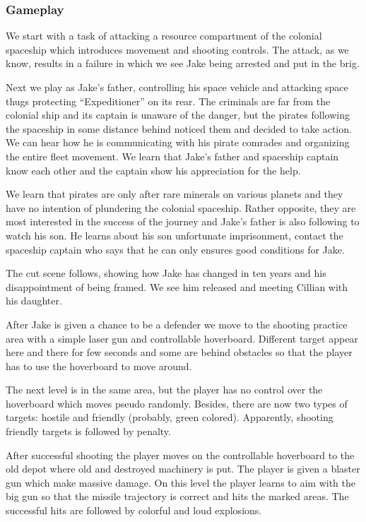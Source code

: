 \documentclass{article}
\begin{document}
\subsubsection*{Gameplay}

We start with a task of attacking a resource compartment of the colonial
spaceship which introduces movement and shooting controls. The attack, as we
know, results in a failure in which we see Jake being arrested and put in the
brig.

Next we play as Jake's father, controlling his space vehicle and attacking space
thugs protecting ``Expeditioner'' on its rear. The criminals are far from the
colonial ship and its captain is unaware of the danger, but the pirates
following the spaceship in some distance behind noticed them and decided to take
action.  We can hear how he is communicating with his pirate comrades and
organizing the entire fleet movement. We learn that Jake's father and spaceship
captain know each other and the captain show his appreciation for the help.

We learn that pirates are only after rare minerals on various planets and they
have no intention of plundering the colonial spaceship. Rather opposite, they
are most interested in the success of the journey and Jake's father is also
following to watch his son. He learns about his son unfortunate imprisonment,
contact the spaceship captain who says that he can only ensures good conditions
for Jake.

The cut scene follows, showing how Jake has changed in ten years and his
disappointment of being framed. We see him released and meeting Cillian with his
daughter.

After Jake is given a chance to be a defender we move to the shooting practice
area with a simple laser gun and controllable hoverboard. Different target
appear here and there for few seconds and some are behind obstacles so that the
player has to use the hoverboard to move around.

The next level is in the same area, but the player has no control over the
hoverboard which moves pseudo randomly. Besides, there are now two types of
targets: hostile and friendly (probably, green colored). Apparently, shooting
friendly targets is followed by penalty.

After successful shooting the player moves on the controllable hoverboard to the
old depot where old and destroyed machinery is put. The player is given a
blaster gun which make massive damage. On this level the player learns to aim
with the big gun so that the missile trajectory is correct and hits the marked
areas. The successful hits are followed by colorful and loud explosions.
\end{document}
